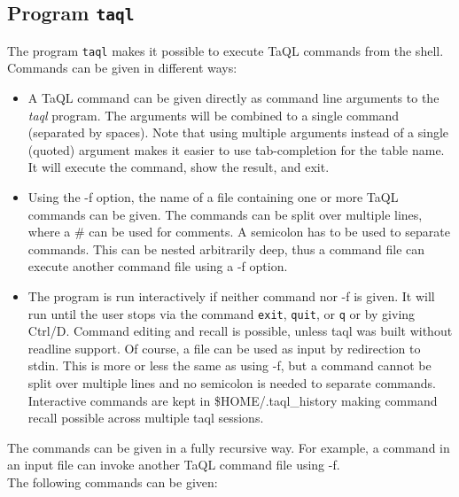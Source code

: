\subsection{Program \texttt{taql}}
  The program \texttt{taql} makes it possible to execute TaQL commands
  from the shell. Commands can be given in different ways:
  \begin {itemize}
  \item A TaQL command can be given directly as command line
    arguments to the {\em taql}
    program. The arguments will be combined to a single command
    (separated by spaces). Note
    that using multiple arguments instead of a single (quoted)
    argument makes it easier to use tab-completion for the
    table name.
    It will execute the command, show the result, and exit.
  \item Using the -f option, the name of a file containing one or more TaQL
    commands can be given. The commands can be split over multiple
    lines, where a \# can be used for comments. A semicolon has to be
    used to separate commands.
    This can be nested arbitrarily deep, thus a command file can
    execute another command file using a -f option.
  \item The program is run interactively if neither command nor -f is given.
    It will run until the user stops via the  command \texttt{exit},
    \texttt{quit}, or \texttt{q} or by giving Ctrl/D. Command editing
    and recall is possible, unless taql was built without readline
    support. Of course, a file can be used as input by redirection to stdin. This is
    more or less the same as using -f, but a command cannot be split
    over multiple lines and no semicolon is needed to separate commands.
    Interactive commands are kept in \$HOME/.taql\_history making
    command recall possible across multiple taql sessions.
  \end{itemize}
  The commands can be given in a fully recursive way. For example, a command
  in an input file can invoke another TaQL command file using -f.
  \\The following commands can be given:
